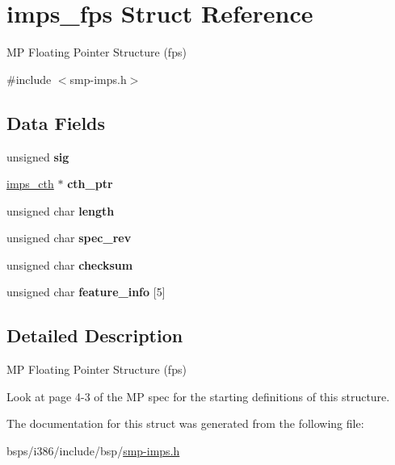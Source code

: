 \hypertarget{structimps__fps}{}\section{imps\+\_\+fps Struct Reference}
\label{structimps__fps}


MP Floating Pointer Structure (fps)  




{\ttfamily \#include $<$smp-\/imps.\+h$>$}

\subsection*{Data Fields}
\begin{DoxyCompactItemize}
\item 
\mbox{\label{structimps__fps_a3569f016d4f43c68935b4cbab2721683}} 
unsigned {\bfseries sig}
\item 
\mbox{\label{structimps__fps_a9318cc93a880becc28bc9e4c86cd0a56}} 
\mbox{\hyperlink{structimps__cth}{imps\+\_\+cth}} $\ast$ {\bfseries cth\+\_\+ptr}
\item 
\mbox{\label{structimps__fps_a8a7293feff3f7e59232b1ede414d5665}} 
unsigned char {\bfseries length}
\item 
\mbox{\label{structimps__fps_a0ede02c49c9864f6b34894268a3eeb0d}} 
unsigned char {\bfseries spec\+\_\+rev}
\item 
\mbox{\label{structimps__fps_a87eda4df42a9106bd3577c218040383f}} 
unsigned char {\bfseries checksum}
\item 
\mbox{\label{structimps__fps_ac3092723ac02ecff88248da7c595099a}} 
unsigned char {\bfseries feature\+\_\+info} \mbox{[}5\mbox{]}
\end{DoxyCompactItemize}


\subsection{Detailed Description}
MP Floating Pointer Structure (fps) 

Look at page 4-\/3 of the MP spec for the starting definitions of this structure. 

The documentation for this struct was generated from the following file\+:\begin{DoxyCompactItemize}
\item 
bsps/i386/include/bsp/\mbox{\hyperlink{smp-imps_8h}{smp-\/imps.\+h}}\end{DoxyCompactItemize}
